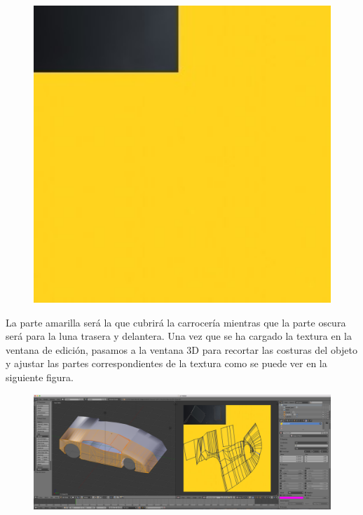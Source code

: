 \documentclass[10pt]{article}
\begin{document}
\begin{figure}[H]
	\begin{center}
	 		\includegraphics[width = 1.00\textwidth]{Imagenes/p3-img14}
	\end{center} 
\end{figure}

La parte amarilla será la que cubrirá la carrocería mientras que la parte oscura será para la luna trasera y delantera. Una vez que se ha cargado la textura en la ventana de edición, pasamos a la ventana 3D para recortar las costuras del objeto y ajustar las partes correspondientes de la textura como se puede ver en la siguiente figura. \\

\begin{figure}[H]
	\begin{center}
	 		\includegraphics[width = 1.00\textwidth]{Imagenes/p3-img15}
	\end{center} 
\end{figure}
\end{document}
